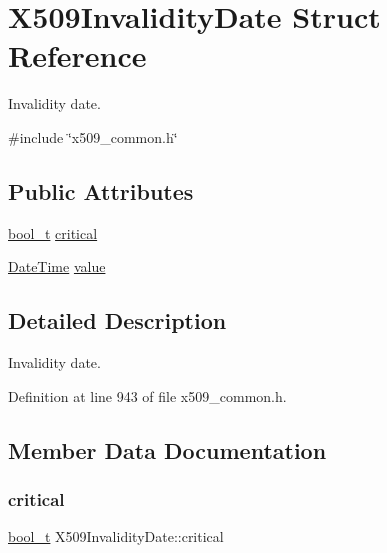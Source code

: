 \hypertarget{structX509InvalidityDate}{}\section{X509\+Invalidity\+Date Struct Reference}
\label{structX509InvalidityDate}


Invalidity date.  




{\ttfamily \#include \char`\"{}x509\+\_\+common.\+h\char`\"{}}

\subsection*{Public Attributes}
\begin{DoxyCompactItemize}
\item 
\hyperlink{compiler__port_8h_a812d16e5494522586b3784e55d479912}{bool\+\_\+t} \hyperlink{structX509InvalidityDate_a657d7508949fd6cacc4e13afb15d3b29}{critical}
\item 
\hyperlink{structDateTime}{Date\+Time} \hyperlink{structX509InvalidityDate_a45d8ce42e99a17e69ae7cb5fca80383d}{value}
\end{DoxyCompactItemize}


\subsection{Detailed Description}
Invalidity date. 

Definition at line 943 of file x509\+\_\+common.\+h.



\subsection{Member Data Documentation}
\mbox{\label{structX509InvalidityDate_a657d7508949fd6cacc4e13afb15d3b29}} 
\subsubsection{\texorpdfstring{critical}{critical}}
{\footnotesize\ttfamily \hyperlink{compiler__port_8h_a812d16e5494522586b3784e55d479912}{bool\+\_\+t} X509\+Invalidity\+Date\+::critical}



